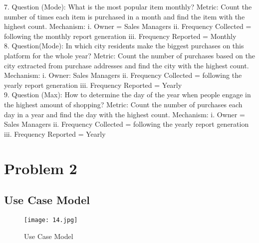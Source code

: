 \documentclass[12pt,letterpaper]{report}
\begin{document}
7. Question (Mode): What is the most popular item monthly?
Metric: Count the number of times each item is purchased in a month and find the item with the highest count.
Mechanism:
i. Owner = Sales Managers
ii. Frequency Collected = following the monthly report generation
iii. Frequency Reported = Monthly\\[1\baselineskip]


8. Question(Mode): In which city residents make the biggest purchases on this platform for the whole year?
Metric: Count the number of purchases based on the city extracted from purchase addresses and find the city with the highest count.
Mechanism:
i. Owner: Sales Managers
ii. Frequency Collected = following the yearly report generation
iii. Frequency Reported = Yearly\\[1\baselineskip]


9. Question (Max): How to determine the day of the year when people engage in the highest amount of shopping?
Metric: Count the number of purchases each day in a year and find the day with the highest count.
Mechanism:
i. Owner = Sales Managers
ii. Frequency Collected = following the yearly report generation
iii. Frequency Reported = Yearly\\[1\baselineskip]


\chapter {Problem 2}

\section{Use Case Model}

\begin{figure}[h]
    \begin{center}
    \texttt{[image: 14.jpg]}
    \end{center}
       \caption{Use Case Model \label{Use Case Model}}
\end{figure}
\end{document}
